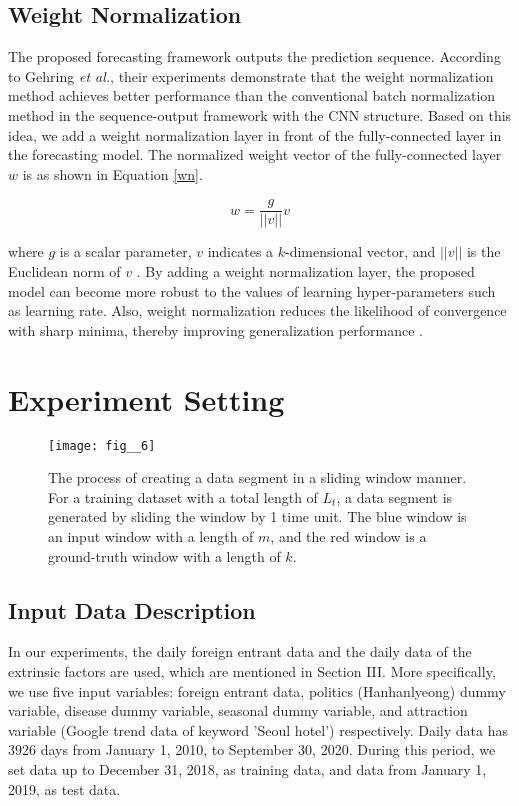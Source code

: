 \documentclass[conference]{IEEEtran}
\begin{document}
\subsection{Weight Normalization} 

The proposed forecasting framework outputs the prediction sequence. According to Gehring \textit{et al.}\cite{gehring2017convolutional}, their experiments demonstrate that the weight normalization method achieves better performance than the conventional batch normalization method in the sequence-output framework with the CNN structure. Based on this idea, we add a weight normalization layer in front of the fully-connected layer in the forecasting model. The normalized weight vector of the fully-connected layer \(w\) is as shown in Equation \eqref{wn}.

\begin{equation}
w = \frac{g}{||v||}v \label{wn}
\end{equation}

\noindent where \(g\) is a scalar parameter, \(v\) indicates a \(k\)-dimensional vector, and \(||v||\) is the Euclidean norm of \(v\) \cite{salimans2016weight}. By adding a weight normalization layer, the proposed model can become more robust to the values of learning hyper-parameters such as learning rate. Also, weight normalization reduces the likelihood of convergence with sharp minima, thereby improving generalization performance \cite{qiao2019micro}.


\section{Experiment Setting}

\begin{figure}[t]
\begin{center}
\texttt{[image: fig\_\_6]}
\end{center}
   \caption{The process of creating a data segment in a sliding window manner. For a training dataset with a total length of \(L_t\), a data segment is generated by sliding the window by 1 time unit. The blue window is an input window with a length of \(m\), and the red window is a ground-truth window with a length of \(k\).}
\label{fig:fig8}
\end{figure}

\subsection{Input Data Description} 
In our experiments, the daily foreign entrant data and the daily data of the extrinsic factors are used, which are mentioned in Section III. More specifically, we use five input variables: foreign entrant data, politics (Hanhanlyeong) dummy variable, disease dummy variable, seasonal dummy variable, and attraction variable (Google trend data of keyword ’Seoul hotel’) respectively. Daily data has 3926 days from January 1, 2010, to September 30, 2020. During this period, we set data up to December 31, 2018, as training data, and data from January 1, 2019, as test data.
\end{document}
